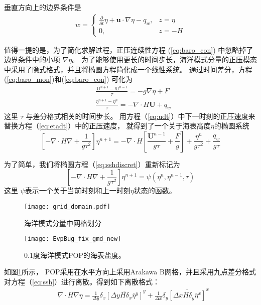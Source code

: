 垂直方向上的边界条件是
\begin{align}
\label{eq:bound_w}
w = \left\{ \begin{array}{ll}
\frac{\partial}{\partial t} \eta  +\textbf{u}\cdot\nabla \eta - q_w, & z = \eta  \\
0, & z = -H
\end{array} \right.
\end{align}
 
值得一提的是，为了简化求解过程，正压连续性方程 (\ref{eq:baro_con}) 中忽略掉了边界条件中的小项 $\nabla \eta$\citep{smith2010parallel}。
为了能够使用更长的时间步长，海洋模式分量的正压模态中采用了隐式格式，并且将椭圆方程简化成一个线性系统。 通过时间差分，方程  (\ref{eq:baro_mon})和(\ref{eq:baro_con}) 可化为
\begin{align}
&\displaystyle \frac{ \textbf{U}^{n+1} - \textbf{U}^{n-1}}{\tau}  = -g \nabla \eta + F \label{eq:udt} \\
&\displaystyle \frac{\eta^{n+1} - \eta^n }{\tau}  = - \nabla \cdot H\textbf{U} + q_w \label{eq:etadt}
\end{align}
这里 $\tau$ 与差分格式相关的时间步长。 
用方程（\ref{eq:udt}）中下一时刻的正压速度来替换方程（\ref{eq:etadt}）中的正压速度， 就得到了一个关于海表高度$\eta$的椭圆系统
\begin{equation}
\label{eq:sshdiscret}
     [-\nabla\cdot H \nabla + \frac{1}{g  \tau^2}]\eta^{n+1}
           = -\nabla\cdot H[\frac{\textbf{U}^{n-1}}{g \tau} + \frac{F}{g}] + \frac{\eta^n}{g\tau^2} +\frac{q_w}{g\tau}
\end{equation}
 
为了简单，我们将椭圆方程（\ref{eq:sshdiscret}）重新标记为
\begin{equation}
\label{eq:ssh}
[-\nabla \cdot H\nabla +\frac{1}{g  \tau^2}]\eta^{n+1} = \psi(\eta^n,\eta^{n-1},\tau)
\end{equation}
这里 $\psi$表示一个关于当前时刻和上一时刻$\eta$状态的函数。
 

\begin{figure}[!htbp]
\centering
\texttt{[image: grid\_domain.pdf]}
\caption[] {海洋模式分量中网格划分\label{fig:grid1}}
\end{figure}

\begin{figure}[!htbp]
\centering
\texttt{[image: EvpBug\_fix\_gmd\_new]}
\caption[] {0.1度海洋模式POP的海表盐度。 \label{fig:sst}}
\end{figure}

如图\ref{fig:grid1}所示， POP采用在水平方向上采用Arakawa B网格\citep{smith2010parallel}，并且采用九点差分格式对方程（\ref{eq:ssh}）进行离散。得到如下离散格式：
\begin{align}
    & \nabla\cdot H \nabla \eta  =\frac{1}{\Delta y}\delta_x \overline{[\Delta y H  \delta_x\overline{\eta}^y]}^y +\frac{1}{\Delta x}\delta_y \overline{[\Delta x H  \delta_y\overline{\eta}^x]}^x \label{eq:nabla2}
  \end{align}

